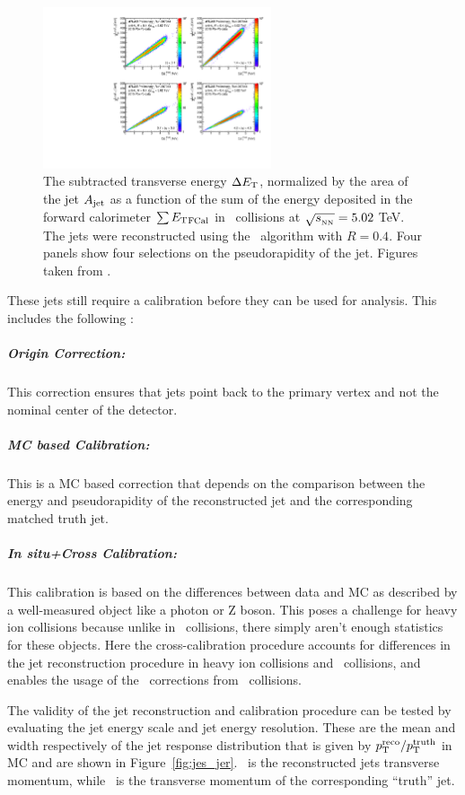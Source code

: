 \begin{figure}[htbp!]
	\centering
	\includegraphics[width=0.6\textwidth]{figures/setup/subtr_energy} %
	\caption{
	The subtracted transverse energy $\Delta \mbox{$E_{\mathrm{T}}$}$, normalized by the area of the jet $A_{\rm{jet}}$ as a function of the sum of the energy deposited in the forward calorimeter $\sum \mbox{$E_{\mathrm{T}}$}_{\rm FCal}$ in \pbpb\ collisions at $\mbox{$\sqrt{s_{_\text{NN}}}$} = 5.02$ TeV.
	The jets were reconstructed using the \antikt\ algorithm with $R = 0.4$.
	Four panels show four selections on the pseudorapidity of the jet.
	Figures taken from \cite{perfPlots}.}	
	\label{fig:subtr_energy}
\end{figure}


These jets still require a calibration before they can be used for analysis.
This includes the following \cite{Aad:2014bia}:
\subparagraph{Origin Correction: } This correction ensures that jets point back to the primary vertex and not the nominal center of the detector.
\subparagraph{MC based Calibration: } This is a MC based correction that depends on the comparison between the energy and pseudorapidity of the reconstructed jet and the corresponding matched truth jet.
\subparagraph{\textit{In situ}+Cross Calibration: } This calibration is based on the differences between data and MC as described by a well-measured object like a photon or Z boson.
This poses a challenge for heavy ion collisions because unlike in \pp\ collisions, there simply aren't enough statistics for these objects.
Here the cross-calibration procedure accounts for differences in the jet reconstruction procedure in heavy ion collisions and \pp\ collisions, and enables the usage of the \insitu\ corrections from \pp\ collisions.


The validity of the jet reconstruction and calibration procedure can be tested by evaluating the jet energy scale and jet energy resolution.
These are the mean and width respectively of the jet response distribution that is given by $\mbox{$p_{\mathrm{T}}^{\mathrm{reco}}$} / \mbox{$p_{\mathrm{T}}^{\mathrm{truth}}$}$ in MC and are shown in Figure~\ref{fig:jes_jer}.
\ptreco\ is the reconstructed jets transverse momentum, while \pttruth\ is the transverse momentum of the corresponding ``truth'' jet.


